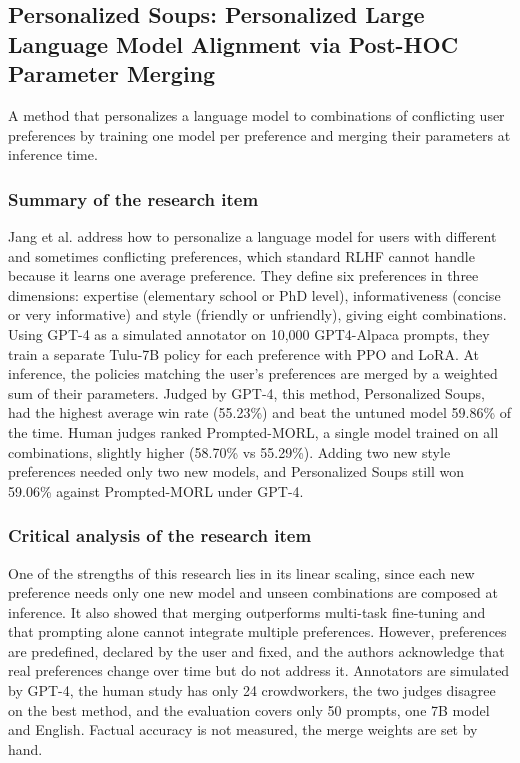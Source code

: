\documentclass{FastFyp}
\begin{document}
\subsection{Personalized Soups: Personalized Large Language Model Alignment via Post-HOC Parameter Merging}
A method that personalizes a language model to combinations of conflicting user preferences by training one model per preference and merging their parameters at inference time.


\subsubsection{Summary of the research item}
Jang et al. \cite{jang2023personalized} address how to personalize a language model for users with different and sometimes conflicting preferences, which standard RLHF cannot handle because it learns one average preference. They define six preferences in three dimensions: expertise (elementary school or PhD level), informativeness (concise or very informative) and style (friendly or unfriendly), giving eight combinations. Using GPT-4 as a simulated annotator on 10,000 GPT4-Alpaca prompts, they train a separate Tulu-7B policy for each preference with PPO and LoRA. At inference, the policies matching the user's preferences are merged by a weighted sum of their parameters. Judged by GPT-4, this method, Personalized Soups, had the highest average win rate (55.23\%) and beat the untuned model 59.86\% of the time. Human judges ranked Prompted-MORL, a single model trained on all combinations, slightly higher (58.70\% vs 55.29\%). Adding two new style preferences needed only two new models, and Personalized Soups still won 59.06\% against Prompted-MORL under GPT-4.


\subsubsection{Critical analysis of the research item}
One of the strengths of this research lies in its linear scaling, since each new preference needs only one new model and unseen combinations are composed at inference. It also showed that merging outperforms multi-task fine-tuning and that prompting alone cannot integrate multiple preferences. However, preferences are predefined, declared by the user and fixed, and the authors acknowledge that real preferences change over time but do not address it. Annotators are simulated by GPT-4, the human study has only 24 crowdworkers, the two judges disagree on the best method, and the evaluation covers only 50 prompts, one 7B model and English. Factual accuracy is not measured, the merge weights are set by hand.
\end{document}
